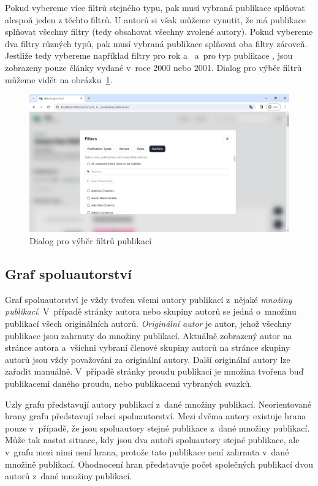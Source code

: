 \documentclass[
  biblatex,
  sourcecodes,
  glossaries,
  index
]{kidiplom}
\begin{document}
Pokud vybereme více filtrů stejného typu, pak musí vybraná publikace splňovat alespoň jeden z těchto filtrů. U autorů si však můžeme vynutit, že má publikace splňovat všechny filtry (tedy obsahovat všechny zvolené autory). Pokud vybereme dva filtry různých typů, pak musí vybraná publikace splňovat oba filtry zároveň. Jestliže tedy vybereme například filtry pro rok  a~ a~pro typ publikace , jsou zobrazeny pouze články vydané v~roce 2000 nebo 2001. Dialog pro výběr filtrů můžeme vidět na obrázku~\ref{fig:filtrovaci_dialog}.

\begin{figure}[H]
\begin{center}
\includegraphics[width=\textwidth]{filtrovaci_dialog}
\caption{Dialog pro výběr filtrů publikací}\label{fig:filtrovaci_dialog}
\end{center}
\end{figure}

\subsection{Graf spoluautorství} \label{sec:graf_spoluautorstvi}

Graf spoluautorství je vždy tvořen všemi autory publikací z~nějaké \textit{množiny publikací}. V~případě stránky autora nebo skupiny autorů se jedná o~množinu publikací všech originálních autorů. \textit{Originální autor} je autor, jehož všechny publikace jsou zahrnuty do množiny publikací. Aktuálně zobrazený autor na stránce autora a~všichni vybraní členové skupiny autorů na stránce skupiny autorů jsou vždy považováni za originální autory. Další originální autory lze zařadit manuálně. V~případě stránky proudu publikací je množina tvořena buď publikacemi daného proudu, nebo publikacemi vybraných svazků.

Uzly grafu představují autory publikací z~dané množiny publikací. Neorientované hrany grafu představují relaci spoluautorství. Mezi dvěma autory existuje hrana pouze v~případě, že jsou spoluautory stejné publikace z~dané množiny publikací. Může tak nastat situace, kdy jsou dva autoři spoluautory stejné publikace, ale v~grafu mezi nimi není hrana, protože tato publikace není zahrnuta v~dané množině publikací. Ohodnocení hran představuje počet společných publikací dvou autorů z~dané množiny publikací.
\end{document}
